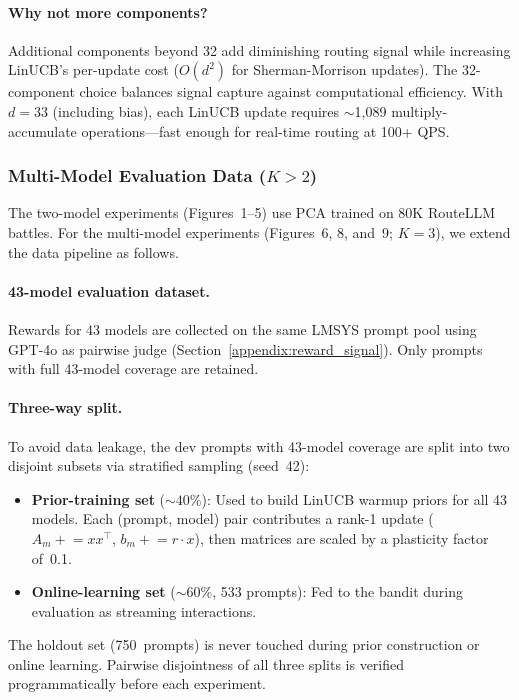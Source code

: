 \paragraph{Why not more components?}
Additional components beyond 32 add diminishing routing signal while
increasing LinUCB's per-update cost ($O(d^2)$ for Sherman-Morrison updates).
The 32-component choice balances signal capture against computational
efficiency.  With $d = 33$ (including bias), each LinUCB update requires
${\sim}$1,089 multiply-accumulate operations---fast enough for real-time
routing at 100+ QPS.

\subsubsection{Multi-Model Evaluation Data ($K{>}2$)}
\label{sec:multimodel_data}

The two-model experiments (Figures~1--5) use PCA trained on 80K RouteLLM
battles.  For the multi-model experiments (Figures~6, 8, and~9;
$K{=}3$), we extend the data pipeline as follows.

\paragraph{43-model evaluation dataset.}
Rewards for 43 models are collected on the same LMSYS prompt pool using
GPT-4o as pairwise judge (Section~\ref{appendix:reward_signal}).  Only
prompts with full 43-model coverage are retained.

\paragraph{Three-way split.}
To avoid data leakage, the dev prompts with 43-model coverage are split into
two disjoint subsets via stratified sampling (seed~42):
\begin{itemize}[leftmargin=*,noitemsep,topsep=0pt]
    \item \textbf{Prior-training set} (${\sim}40\%$): Used to build LinUCB
          warmup priors for all 43 models.  Each (prompt, model) pair
          contributes a rank-1 update ($A_m \mathrel{+}= x x^\top$,
          $b_m \mathrel{+}= r \cdot x$), then matrices are scaled by a
          plasticity factor of~0.1.
    \item \textbf{Online-learning set} (${\sim}60\%$, 533 prompts): Fed to the
          bandit during evaluation as streaming interactions.
\end{itemize}
The holdout set (750~prompts) is never touched during prior construction or
online learning.  Pairwise disjointness of all three splits is verified
programmatically before each experiment.

